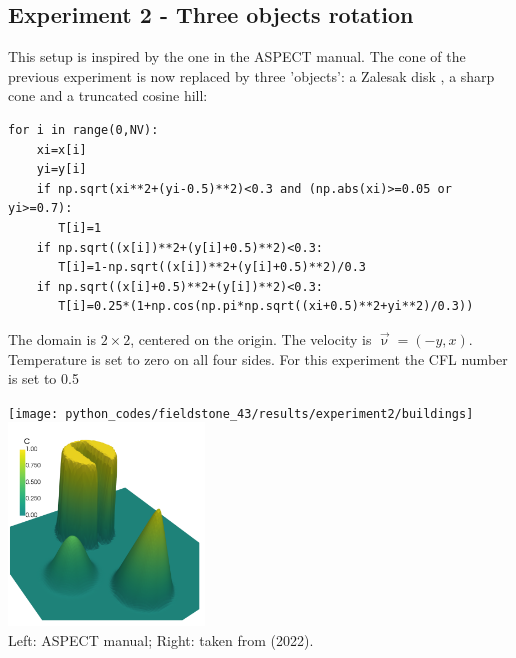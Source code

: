 \subsection*{Experiment 2 - Three objects rotation}

This setup is inspired by the one in the ASPECT manual. The cone of the previous 
experiment is now replaced by three 'objects': a Zalesak disk \cite{zale79}, 
a sharp cone and a truncated cosine hill:

\begin{lstlisting}
for i in range(0,NV):
    xi=x[i]
    yi=y[i]
    if np.sqrt(xi**2+(yi-0.5)**2)<0.3 and (np.abs(xi)>=0.05 or yi>=0.7):
       T[i]=1
    if np.sqrt((x[i])**2+(y[i]+0.5)**2)<0.3:
       T[i]=1-np.sqrt((x[i])**2+(y[i]+0.5)**2)/0.3
    if np.sqrt((x[i]+0.5)**2+(y[i])**2)<0.3:
       T[i]=0.25*(1+np.cos(np.pi*np.sqrt((xi+0.5)**2+yi**2)/0.3))
\end{lstlisting}

The domain is $2\times2$, centered on the origin. The velocity is $\vec\upnu=(-y,x)$. Temperature 
is set to zero on all four sides. For this experiment the CFL number is set to 0.5

\begin{center}
\texttt{[image: python\_codes/fieldstone\_43/results/experiment2/buildings]}
\includegraphics[width=5.2cm]{python_codes/fieldstone_43/results/experiment2/kome22}\\
{\captionfont Left: ASPECT manual; Right: taken from \textcite{kome22} (2022).}
\end{center}


